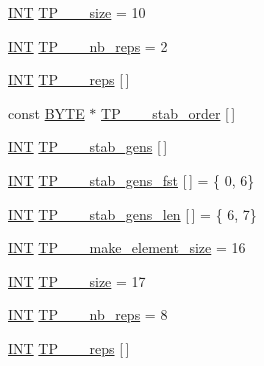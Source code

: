 \begin{DoxyCompactItemize}
\item 
\mbox{\hyperlink{galois_8h_a09fddde158a3a20bd2dcadb609de11dc}{I\+NT}} \mbox{\hyperlink{data___t_p_8_c_a6cd0258709bc873c68e7b65b2b644e88}{T\+P\+\_\+\_\+\_\+size}} = 10
\item 
\mbox{\hyperlink{galois_8h_a09fddde158a3a20bd2dcadb609de11dc}{I\+NT}} \mbox{\hyperlink{data___t_p_8_c_af5889f3566f9910209bede7fb9f3c9fd}{T\+P\+\_\+\_\+\_\+nb\+\_\+reps}} = 2
\item 
\mbox{\hyperlink{galois_8h_a09fddde158a3a20bd2dcadb609de11dc}{I\+NT}} \mbox{\hyperlink{data___t_p_8_c_af0696aeee01dda2d2be4a4d58a510a89}{T\+P\+\_\+\_\+\_\+reps}} \mbox{[}$\,$\mbox{]}
\item 
const \mbox{\hyperlink{galois_8h_ab6cc7b4aeb6ea31aba2b3fbfc83ff5e6}{B\+Y\+TE}} $\ast$ \mbox{\hyperlink{data___t_p_8_c_a8e7e8ca819efee13b4e86a94c70385f7}{T\+P\+\_\+\_\+\_\+stab\+\_\+order}} \mbox{[}$\,$\mbox{]}
\item 
\mbox{\hyperlink{galois_8h_a09fddde158a3a20bd2dcadb609de11dc}{I\+NT}} \mbox{\hyperlink{data___t_p_8_c_a15831fd1dbce0424dab83e984bd92e4c}{T\+P\+\_\+\_\+\_\+stab\+\_\+gens}} \mbox{[}$\,$\mbox{]}
\item 
\mbox{\hyperlink{galois_8h_a09fddde158a3a20bd2dcadb609de11dc}{I\+NT}} \mbox{\hyperlink{data___t_p_8_c_a169fca260bd87f572eaf7bd0b5b77273}{T\+P\+\_\+\_\+\_\+stab\+\_\+gens\+\_\+fst}} \mbox{[}$\,$\mbox{]} = \{ 0, 6\}
\item 
\mbox{\hyperlink{galois_8h_a09fddde158a3a20bd2dcadb609de11dc}{I\+NT}} \mbox{\hyperlink{data___t_p_8_c_a04b972b67b0b70b97f46505a50e1d7cb}{T\+P\+\_\+\_\+\_\+stab\+\_\+gens\+\_\+len}} \mbox{[}$\,$\mbox{]} = \{ 6, 7\}
\item 
\mbox{\hyperlink{galois_8h_a09fddde158a3a20bd2dcadb609de11dc}{I\+NT}} \mbox{\hyperlink{data___t_p_8_c_a5ec38f482c28f21c93a03fdd4ebcd947}{T\+P\+\_\+\_\+\_\+make\+\_\+element\+\_\+size}} = 16
\item 
\mbox{\hyperlink{galois_8h_a09fddde158a3a20bd2dcadb609de11dc}{I\+NT}} \mbox{\hyperlink{data___t_p_8_c_aeab15dbc2a6b08bfbbbd35ee0fbd97bd}{T\+P\+\_\+\_\+\_\+size}} = 17
\item 
\mbox{\hyperlink{galois_8h_a09fddde158a3a20bd2dcadb609de11dc}{I\+NT}} \mbox{\hyperlink{data___t_p_8_c_a2012d7ba53db0f099f2700a59a842abe}{T\+P\+\_\+\_\+\_\+nb\+\_\+reps}} = 8
\item 
\mbox{\hyperlink{galois_8h_a09fddde158a3a20bd2dcadb609de11dc}{I\+NT}} \mbox{\hyperlink{data___t_p_8_c_ab6eae0904bc3a5c5bb88e267aaca5edb}{T\+P\+\_\+\_\+\_\+reps}} \mbox{[}$\,$\mbox{]}

\end{DoxyCompactItemize}
